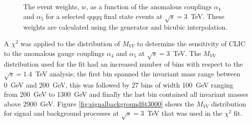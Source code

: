\begin{figure}[h!]
\centering
{}
\caption[The event weights, $w$, as a function of the anomalous couplings $\alpha_{4}$ and $\alpha_{5}$ for a selected \nu{\nu}qqqq final state events at $\sqrt{s}=3$~TeV.  These weights are calculated using \protect{} the generator and \protect{} bicubic interpolation.]{The event weights, $w$, as a function of the anomalous couplings $\alpha_{4}$ and $\alpha_{5}$ for a selected \nu{\nu}qqqq final state events at $\sqrt{s}=3$~TeV.  These weights are calculated using \protect{} the generator and \protect{} bicubic interpolation.}
\label{fig:eventweights3000}
\end{figure}

A $\chi^{2}$ was applied to the distribution of $M_{VV}$ to determine the sensitivity of CLIC to the anomalous gauge couplings $\alpha_{4}$ and $\alpha_{5}$ at $\sqrt{s}=3$~TeV.  The $M_{VV}$ distribution used for the fit had an increased number of bins with respect to the $\sqrt{s}=1.4$~TeV analysis; the first bin spanned the invariant mass range between 0~GeV and 200~GeV, this was followed by 27 bins of width 100~GeV ranging from 200~GeV to 1300~GeV and finally the last bin contained all invariant masses above 2900~GeV.  Figure \ref{fig:signalbackgroundfit3000} shows the $M_{VV}$ distribution for signal and background processes at $\sqrt{s}=3$~TeV that was used in the $\chi^{2}$ fit.  

